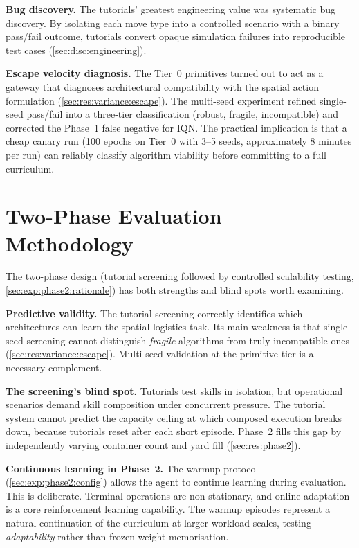 \textbf{Bug discovery.} The tutorials' greatest engineering value was systematic bug discovery. By isolating each move type into a controlled scenario with a binary pass/fail outcome, tutorials convert opaque simulation failures into reproducible test cases (\cref{sec:disc:engineering}).

\textbf{Escape velocity diagnosis.} The Tier~0 primitives turned out to act as a gateway that diagnoses architectural compatibility with the spatial action formulation (\cref{sec:res:variance:escape}). The multi-seed experiment refined single-seed pass/fail into a three-tier classification (robust, fragile, incompatible) and corrected the Phase~1 false negative for IQN. The practical implication is that a cheap canary run (100 epochs on Tier~0 with 3--5 seeds, approximately 8 minutes per run) can reliably classify algorithm viability before committing to a full curriculum.

\section{Two-Phase Evaluation Methodology}
\label{sec:disc:methodology}

The two-phase design (tutorial screening followed by controlled scalability testing, \cref{sec:exp:phase2:rationale}) has both strengths and blind spots worth examining.

\textbf{Predictive validity.} The tutorial screening correctly identifies which architectures can learn the spatial logistics task. Its main weakness is that single-seed screening cannot distinguish \emph{fragile} algorithms from truly incompatible ones (\cref{sec:res:variance:escape}). Multi-seed validation at the primitive tier is a necessary complement.

\textbf{The screening's blind spot.} Tutorials test skills in isolation, but operational scenarios demand skill composition under concurrent pressure. The tutorial system cannot predict the capacity ceiling at which composed execution breaks down, because tutorials reset after each short episode. Phase~2 fills this gap by independently varying container count and yard fill (\cref{sec:res:phase2}).

\textbf{Continuous learning in Phase~2.} The warmup protocol (\cref{sec:exp:phase2:config}) allows the agent to continue learning during evaluation. This is deliberate. Terminal operations are non-stationary, and online adaptation is a core reinforcement learning capability. The warmup episodes represent a natural continuation of the curriculum at larger workload scales, testing \emph{adaptability} rather than frozen-weight memorisation.

